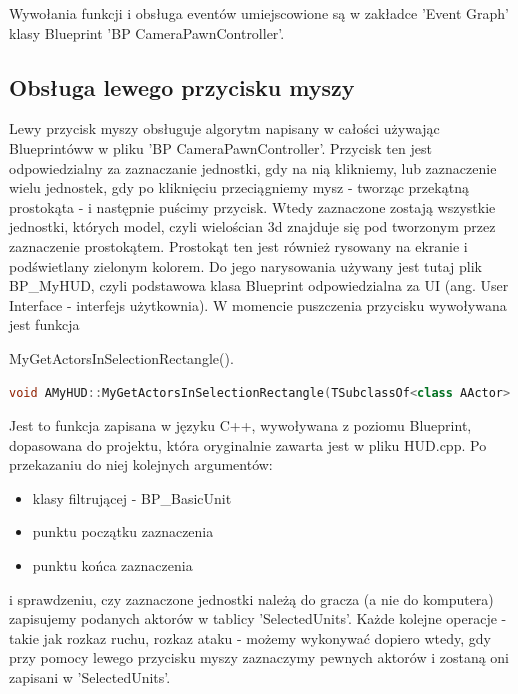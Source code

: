 \documentclass[12pt]{report}
\begin{document}
Wywołania funkcji i obsługa eventów umiejscowione są w zakładce 'Event Graph' klasy Blueprint 'BP CameraPawnController'.

\subsection{Obsługa lewego przycisku myszy}

Lewy przycisk myszy obsługuje algorytm napisany w całości używając Blueprintóww w pliku 'BP CameraPawnController'. Przycisk ten jest odpowiedzialny za zaznaczanie jednostki, gdy na nią klikniemy, lub zaznaczenie wielu jednostek, gdy po kliknięciu przeciągniemy mysz - tworząc przekątną prostokąta - i następnie puścimy przycisk. Wtedy zaznaczone zostają wszystkie jednostki, których model, czyli wielościan 3d znajduje się pod tworzonym przez zaznaczenie prostokątem. Prostokąt ten jest również rysowany na ekranie i podświetlany zielonym kolorem. Do jego narysowania używany jest tutaj plik BP\_MyHUD, czyli podstawowa klasa Blueprint odpowiedzialna za UI (ang. User Interface - interfejs użytkownia). W momencie puszczenia przycisku wywoływana jest funkcja 

MyGetActorsInSelectionRectangle().
\begin{lstlisting}[language=C++, backgroundcolor=\color{black!5}, basicstyle=\footnotesize, caption=Funkcja MyGetActorsInSelectionRectangle() w klasie MyHUD.]
void AMyHUD::MyGetActorsInSelectionRectangle(TSubclassOf<class AActor> ClassFilter, const FVector2D& FirstPoint, const FVector2D& SecondPoint, TArray<AActor*>& OutActors)
\end{lstlisting}

Jest to funkcja zapisana w języku C++, wywoływana z poziomu Blueprint, dopasowana do projektu, która oryginalnie zawarta jest w pliku HUD.cpp. Po przekazaniu do niej kolejnych argumentów: 
\begin{itemize}
\item[--] klasy filtrującej - BP\_BasicUnit
\item[--] punktu początku zaznaczenia 
\item[--] punktu końca zaznaczenia
\end{itemize}

i sprawdzeniu, czy zaznaczone jednostki należą do gracza (a nie do komputera) zapisujemy podanych aktorów w tablicy 'SelectedUnits'. Każde kolejne operacje - takie jak rozkaz ruchu, rozkaz ataku - możemy wykonywać dopiero wtedy, gdy przy pomocy lewego przycisku myszy zaznaczymy pewnych aktorów i zostaną oni zapisani w 'SelectedUnits'. 
\end{document}
